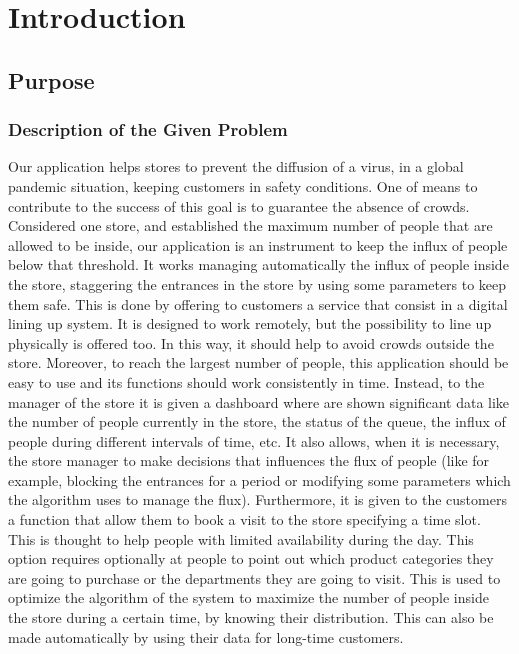 \chapter{Introduction}


\section{Purpose}

\subsection{Description of the Given Problem}

Our application helps stores to prevent the diffusion of a virus, in a global pandemic situation, keeping customers in safety conditions.
One of means to contribute to the success of this goal is to guarantee the absence of crowds.
Considered one store, and established the maximum number of people that are allowed to be inside, our application is an instrument to keep the influx of people below that threshold.
It works managing automatically the influx of people inside the store, staggering the entrances in the store by using some parameters to keep them safe.
This is done by offering to customers a service that consist in a digital lining up system. It is designed to work remotely, but the possibility to line up physically is offered too. In this way, it should help to avoid crowds outside the store.
Moreover, to reach the largest number of people, this application should be easy to use and its functions should work consistently in time.
Instead, to the manager of the store it is given a dashboard where are shown significant data like the number of people currently in the store, the status of the queue, the influx of people during different intervals of time, etc. It also allows, when it is necessary, the store manager to make decisions that influences the flux of people (like for example, blocking the entrances for a period or modifying some parameters which the algorithm uses to manage the flux).
Furthermore, it is given to the customers a function that allow them to book a visit to the store specifying a time slot. This is thought to help people with limited availability during the day.
This option requires optionally at people to point out which product categories they are going to purchase or the departments they are going to visit. This is used to optimize the algorithm of the system to maximize the number of people inside the store during a certain time, by knowing their distribution. This can also be made automatically by using their data for long-time customers.

